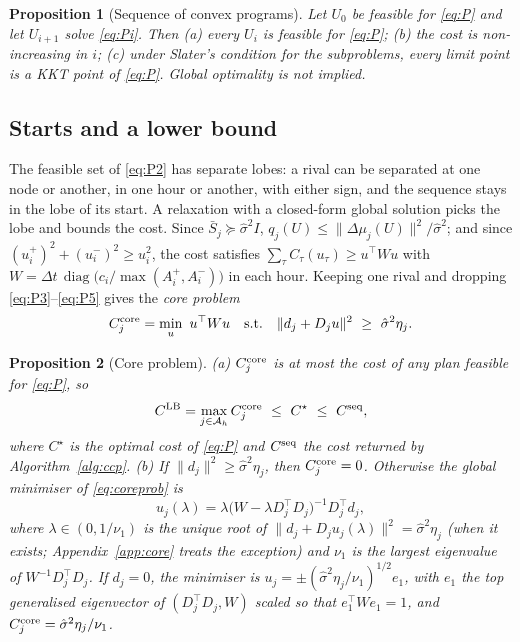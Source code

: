 \documentclass[journal,onecolumn,11pt]{IEEEtran}
\newtheorem{proposition}{Proposition}
\DeclareMathOperator{\diag}{diag}
\newcommand{\tp}{^{\top}}
\begin{document}
\begin{proposition}[Sequence of convex programs]\label{prop:seq}
Let $U_0$ be feasible for \eqref{eq:P} and let $U_{i+1}$ solve \eqref{eq:Pi}. Then (a) every $U_i$ is feasible for \eqref{eq:P}; (b) the cost is non-increasing in $i$; (c) under Slater's condition for the subproblems, every limit point is a KKT point of \eqref{eq:P}. Global optimality is not implied.
\end{proposition}

\subsection{Starts and a lower bound}\label{sec:core}
The feasible set of \eqref{eq:P2} has separate lobes: a rival can be separated at one node or another, in one hour or another, with either sign, and the sequence stays in the lobe of its start. A relaxation with a closed-form global solution picks the lobe and bounds the cost. Since $\bar S_j\succeq\hat\sigma^2I$, $q_j(U)\le\|\Delta\mu_j(U)\|^2/\hat\sigma^2$; and since $(u_i^+)^2+(u_i^-)^2\ge u_i^2$, the cost satisfies $\sum_\tau C_\tau(u_\tau)\ge u\tp Wu$ with $W=\Delta t\,\diag\big(c_i/\max(A_i^+,A_i^-)\big)$ in each hour. Keeping one rival and dropping \eqref{eq:P3}--\eqref{eq:P5} gives the \emph{core problem}
\begin{equation}\label{eq:coreprob}
C_j^{\rm core}=\min_u\ u\tp Wu\quad\text{s.t.}\quad\|d_j+D_ju\|^2\ \ge\ \hat\sigma^2\eta_j .
\end{equation}

\begin{proposition}[Core problem]\label{prop:core}
(a) $C_j^{\rm core}$ is at most the cost of any plan feasible for \eqref{eq:P}, so
\begin{equation}\label{eq:gapcore}
C^{\rm LB}=\max_{j\in\mathcal A_h}C_j^{\rm core}\ \le\ C^\star\ \le\ C^{\rm seq},
\end{equation}
where $C^\star$ is the optimal cost of \eqref{eq:P} and $C^{\rm seq}$ the cost returned by Algorithm~\ref{alg:ccp}. (b) If $\|d_j\|^2\ge\hat\sigma^2\eta_j$, then $C_j^{\rm core}=0$. Otherwise the global minimiser of \eqref{eq:coreprob} is
\begin{equation}\label{eq:core}
u_j(\lambda)=\lambda\big(W-\lambda D_j\tp D_j\big)^{-1}D_j\tp d_j,
\end{equation}
where $\lambda\in(0,1/\nu_1)$ is the unique root of $\|d_j+D_ju_j(\lambda)\|^2=\hat\sigma^2\eta_j$ (when it exists; Appendix~\ref{app:core} treats the exception) and $\nu_1$ is the largest eigenvalue of $W^{-1}D_j\tp D_j$. If $d_j=0$, the minimiser is $u_j=\pm(\hat\sigma^2\eta_j/\nu_1)^{1/2}e_1$, with $e_1$ the top generalised eigenvector of $(D_j\tp D_j,W)$ scaled so that $e_1\tp We_1=1$, and $C_j^{\rm core}=\hat\sigma^2\eta_j/\nu_1$.
\end{proposition}
\end{document}
